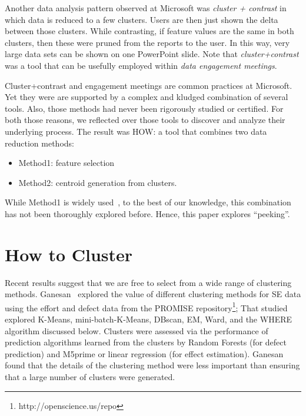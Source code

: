 \documentclass[conference]{IEEEtran}
\newcommand{\bi}{\begin{itemize}}
\newcommand{\ei}{\end{itemize}}
\begin{document}
Another data analysis pattern observed
at Microsoft was  {\em cluster + contrast} in which
data is  reduced to a few
  clusters. Users are then just shown the delta between those
  clusters. While contrasting, if feature values are
  the same in both clusters, then these were pruned from
  the reports to the user. In this way, very large
data sets can be shown on one PowerPoint
slide. Note that {\em cluster+contrast} was a tool that can be usefully employed within
{\em data engagement meetings}.


Cluster+contrast and engagement
meetings are common practices at Microsoft. Yet they were
are supported by a complex and kludged combination of several
tools. Also, those methods had never been rigorously studied or certified.
For both those reasons,
 we reflected over those tools to discover and analyze their
underlying process. The result was HOW: a tool
that combines two
data reduction methods:\bi
\item Method1: feature selection
\item Method2: centroid generation from   clusters.
\ei
While Method1 is widely used~\cite{Menzies2010},
to the best of our knowledge, this combination has not been thoroughly explored before.
Hence, this paper explores ``peeking''.

\section{How to Cluster}
Recent results suggest that we are free to select from a wide range of 
clustering methods.  Ganesan~\cite{div14} explored the value of
different clustering methods for SE data using the  effort and defect data from
the PROMISE repository\footnote{http://openscience.us/repo};
That studied explored
K-Means, mini-batch-K-Means, DBscan, EM, Ward, and the WHERE algorithm discussed
below.
Clusters were assessed via the performance of prediction algorithms
learned from the clusters by Random Forests (for defect prediction)
and M5prime or linear regression (for effect estimation).  Ganesan found
 that the details of the clustering method were less important than ensuring that  a large number of clusters were generated.
\end{document}
